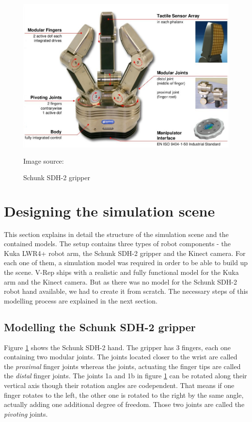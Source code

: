 \begin{figure}[ht]
	\centering
  	\includegraphics[width=1.0\textwidth]{images/sdh_sheet.jpg}
	\caption{Schunk SDH-2 gripper}
	{\scriptsize Image source: \cite{schunk2010}}
	\label{fig:sdh_sheet}
\end{figure}

\section{Designing the simulation scene}

This section explains in detail the structure of the simulation scene and the contained models. The setup contains three types of robot components - the Kuka LWR4+ robot arm, the Schunk SDH-2 gripper and the Kinect camera. For each one of them, a simulation model was required in order to be able to build up the scene. V-Rep ships with a realistic and fully functional model for the Kuka arm and the Kinect camera. But as there was no model for the Schunk SDH-2 robot hand available, we had to create it from scratch. The necessary steps of this modelling process are explained in the next section.

\subsection{Modelling the Schunk SDH-2 gripper}

Figure \ref{fig:sdh_sheet} shows the Schunk SDH-2 hand. The gripper has 3 fingers, each one containing two modular joints. The joints located closer to the wrist are called the \emph{proximal} finger joints whereas the joints, actuating the finger tips are called the \emph{distal} finger joints. The joints 1a and 1b in figure \ref{fig:sdh_sheet} can be rotated along their vertical axis though their rotation angles are codependent. That means if one finger rotates to the left, the other one is rotated to the right by the same angle, actually adding one additional degree of freedom. Those two joints are called the \emph{pivoting} joints. \\

